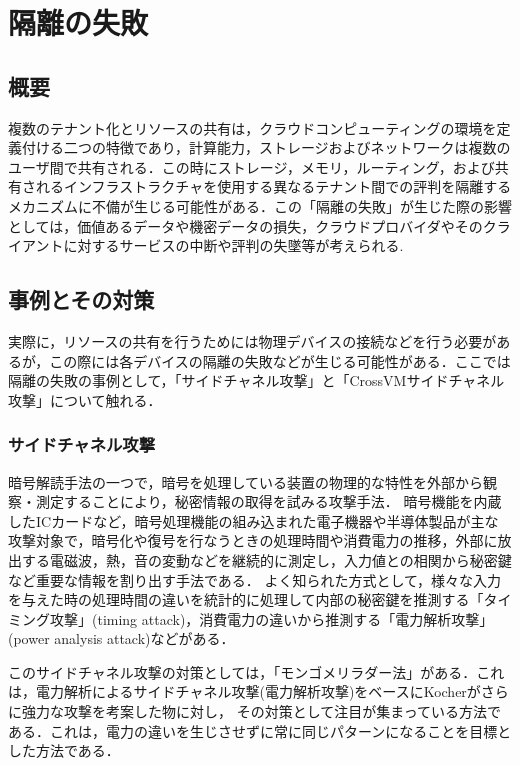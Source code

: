 \section{隔離の失敗}

\subsection{概要}
複数のテナント化とリソースの共有は，クラウドコンピューティングの環境を定義付ける二つの特徴であり，計算能力，ストレージおよびネットワークは複数のユーザ間で共有される．この時にストレージ，メモリ，ルーティング，および共有されるインフラストラクチャを使用する異なるテナント間での評判を隔離するメカニズムに不備が生じる可能性がある．この「隔離の失敗」が生じた際の影響としては，価値あるデータや機密データの損失，クラウドプロバイダやそのクライアントに対するサービスの中断や評判の失墜等が考えられる.

\subsection{事例とその対策}
実際に，リソースの共有を行うためには物理デバイスの接続などを行う必要があるが，この際には各デバイスの隔離の失敗などが生じる可能性がある．ここでは隔離の失敗の事例として，「サイドチャネル攻撃」と「CrossVMサイドチャネル攻撃」について触れる．

\subsubsection{サイドチャネル攻撃}
暗号解読手法の一つで，暗号を処理している装置の物理的な特性を外部から観察・測定することにより，秘密情報の取得を試みる攻撃手法．
暗号機能を内蔵したICカードなど，暗号処理機能の組み込まれた電子機器や半導体製品が主な攻撃対象で，暗号化や復号を行なうときの処理時間や消費電力の推移，外部に放出する電磁波，熱，音の変動などを継続的に測定し，入力値との相関から秘密鍵など重要な情報を割り出す手法である．
よく知られた方式として，様々な入力を与えた時の処理時間の違いを統計的に処理して内部の秘密鍵を推測する「タイミング攻撃」(timing attack)，消費電力の違いから推測する「電力解析攻撃」(power analysis attack)などがある．\par 
このサイドチャネル攻撃の対策としては，「モンゴメリラダー法」\cite{sidechannel}がある．これは，電力解析によるサイドチャネル攻撃(電力解析攻撃)をベースにKocherがさらに強力な攻撃を考案した物\cite{kocher1999}に対し， その対策として注目が集まっている方法である．これは，電力の違いを生じさせずに常に同じパターンになることを目標とした方法である．  
	
